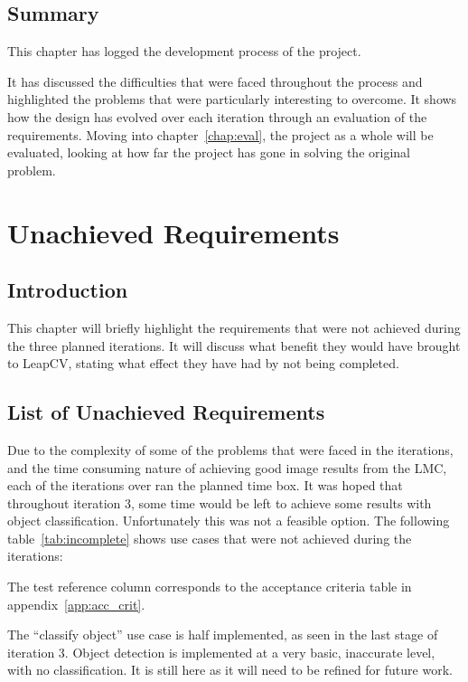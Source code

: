 \documentclass[11pt,oneside]{report}
\begin{document}
	\section{Summary}
	This chapter has logged the development process of the project.
	
	It has discussed the difficulties that were faced throughout the process and highlighted the problems that were particularly interesting to overcome.
	It shows how the design has evolved over each iteration through an evaluation of the requirements.
	Moving into chapter~\ref{chap:eval}, the project as a whole will be evaluated, looking at how far the project has gone in solving the original problem.

	\chapter{Unachieved Requirements}\label{chap:unac}
		\section{Introduction}
		This chapter will briefly highlight the requirements that were not achieved during the three planned iterations.
		It will discuss  what benefit they would have brought to LeapCV, stating what effect they have had by not being completed.
		
		\section{List of Unachieved Requirements}
			Due to the complexity of some of the problems that were faced in the iterations, and the time consuming nature of achieving good image results from the LMC, each of the iterations over ran the planned time box.
			It was hoped that throughout iteration 3, some time would be left to achieve some results with object classification.
			Unfortunately this was not a feasible option.
			The following table~\ref{tab:incomplete} shows use cases that were not achieved during the iterations:
			
			The test reference column corresponds to the acceptance criteria table in appendix~\ref{app:acc_crit}.
			
			The ``classify object'' use case is half implemented, as seen in the last stage of iteration 3.
			Object detection is implemented at a very basic, inaccurate level, with no classification.
			It is still here as it will need to be refined for future work.			
			
\end{document}
